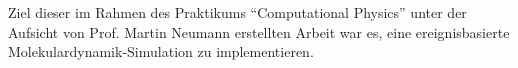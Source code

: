 Ziel dieser im Rahmen des Praktikums ``Computational Physics'' unter der Aufsicht von Prof. Martin Neumann erstellten Arbeit war es, eine ereignisbasierte Molekulardynamik-Simulation zu implementieren. 